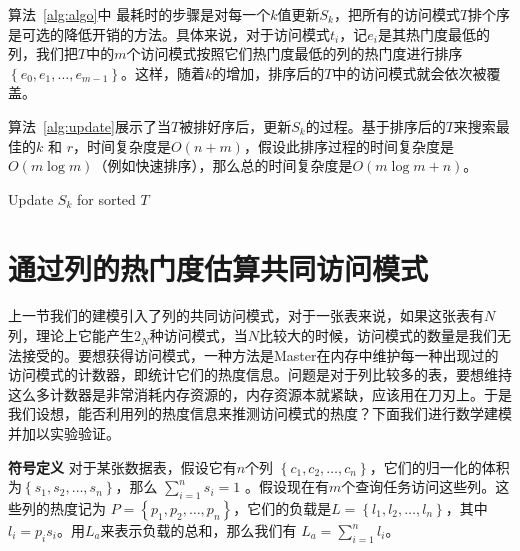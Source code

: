 \par 算法~\ref{alg:algo}中 最耗时的步骤是对每一个$k$值更新$S_k$，把所有的访问模式$T$排个序是可选的降低开销的方法。具体来说，对于访问模式$t_i$，记$e_i$是其热门度最低的列，我们把$T$中的$m$个访问模式按照它们热门度最低的列的热门度进行排序$\left\{e_{0}, e_{1}, \dots, e_{m-1}\right\}$。这样，随着$k$的增加，排序后的$T$中的访问模式就会依次被覆盖。

\par 算法~\ref{alg:update}展示了当$T$被排好序后，更新$S_k$的过程。基于排序后的$T$来搜索最佳的$k$ 和 $r$，时间复杂度是$O(n + m)$，假设此排序过程的时间复杂度是$O(m\log{m})$（例如快速排序），那么总的时间复杂度是$O(m\log{m} + n)$。

\begin{algorithm}[tb]
	\caption{Update $S_k$ for sorted $T$}
	\label{alg:update}
	\small
	\begin{algorithmic}[1]
		\Else
		\State{\Return}
		\EndIf
		\EndFor
		\EndFunction
		
	\end{algorithmic}
\end{algorithm}

\section{通过列的热门度估算共同访问模式}

\par 上一节我们的建模引入了列的共同访问模式，对于一张表来说，如果这张表有$N$列，理论上它能产生$2_N$种访问模式，当$N$比较大的时候，访问模式的数量是我们无法接受的。要想获得访问模式，一种方法是Master在内存中维护每一种出现过的访问模式的计数器，即统计它们的热度信息。问题是对于列比较多的表，要想维持这么多计数器是非常消耗内存资源的，内存资源本就紧缺，应该用在刀刃上。于是我们设想，能否利用列的热度信息来推测访问模式的热度？下面我们进行数学建模并加以实验验证。

\par \noindent \textbf{符号定义} 对于某张数据表，假设它有$n$个列 $\left\{ c_{1}, c_{2}, \dots ,c_{n} \right\} $，它们的归一化的体积为$\left\{ s_{1}, s_{2}, \dots ,s_{n} \right\} $，那么 $\sum_{i=1}^{n}s_i = 1$ 。假设现在有$m$个查询任务访问这些列。这些列的热度记为 $ P = \left\{ p_{1}, p_{2}, \dots, p_{n} \right\} $，它们的负载是$ L = \left\{ l_{1}, l_{2}, \dots, l_{n} \right\} $，其中 $l_i = p_i s_i$。用$L_a$来表示负载的总和，那么我们有 $L_a = \sum_{i=1}^{n}l_i$。

